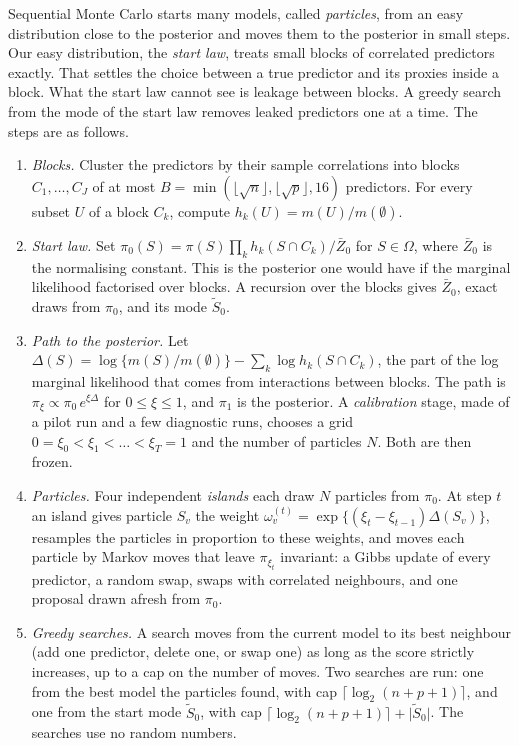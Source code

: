 \documentclass[11pt]{article}
\newcommand{\abs}[1]{\lvert #1\rvert}
\newcommand{\Om}{\Omega}
\newcommand{\tSz}{\tilde S_0}
\theoremstyle{plain}
\theoremstyle{definition}
\begin{document}
Sequential Monte Carlo starts many models, called \emph{particles}, from an easy distribution close to the posterior
and moves them to the posterior in small steps. Our easy distribution, the \emph{start law}, treats small blocks of
correlated predictors exactly. That settles the choice between a true predictor and its proxies inside a block. What the
start law cannot see is leakage between blocks. A greedy search from the mode of the start law removes leaked
predictors one at a time. The steps are as follows.
\begin{enumerate}
  \item \emph{Blocks.} Cluster the predictors by their sample correlations into blocks $C_1,\dots,C_J$ of at most
    $B=\min(\lfloor\sqrt n\rfloor,\lfloor\sqrt p\rfloor,16)$ predictors. For every subset $U$ of a block $C_k$, compute
    $h_k(U)=m(U)/m(\emptyset)$.
  \item \emph{Start law.} Set $\pi_0(S)=\pi(S)\prod_{k}h_k(S\cap C_k)/\bar Z_0$ for $S\in\Om$, where $\bar Z_0$ is the
    normalising constant. This is the posterior one would have if the marginal likelihood factorised over blocks. A
    recursion over the blocks gives $\bar Z_0$, exact draws from $\pi_0$, and its mode $\tSz$.
  \item \emph{Path to the posterior.} Let $\Delta(S)=\log\{m(S)/m(\emptyset)\}-\sum_k\log h_k(S\cap C_k)$, the part of the
    log marginal likelihood that comes from interactions between blocks. The path is $\pi_\xi\propto\pi_0\,e^{\xi\Delta}$
    for $0\le\xi\le1$, and $\pi_1$ is the posterior. A \emph{calibration} stage, made of a pilot run and a few diagnostic
    runs, chooses a grid $0=\xi_0<\xi_1<\dots<\xi_T=1$ and the number of particles $N$. Both are then frozen.
  \item \emph{Particles.} Four independent \emph{islands} each draw $N$ particles from $\pi_0$. At step $t$ an island
    gives particle $S_v$ the weight $\omega^{(t)}_v=\exp\{(\xi_t-\xi_{t-1})\Delta(S_v)\}$, resamples the particles in
    proportion to these weights, and moves each particle by Markov moves that leave $\pi_{\xi_t}$ invariant: a Gibbs
    update of every predictor, a random swap, swaps with correlated neighbours, and one proposal drawn afresh from
    $\pi_0$.
  \item \emph{Greedy searches.} A search moves from the current model to its best neighbour (add one predictor, delete
    one, or swap one) as long as the score strictly increases, up to a cap on the number of moves. Two searches are run:
    one from the best model the particles found, with cap $\lceil\log_2(n+p+1)\rceil$, and one from the start mode $\tSz$,
    with cap $\lceil\log_2(n+p+1)\rceil+\abs{\tSz}$. The searches use no random numbers.
\end{enumerate}
\end{document}
